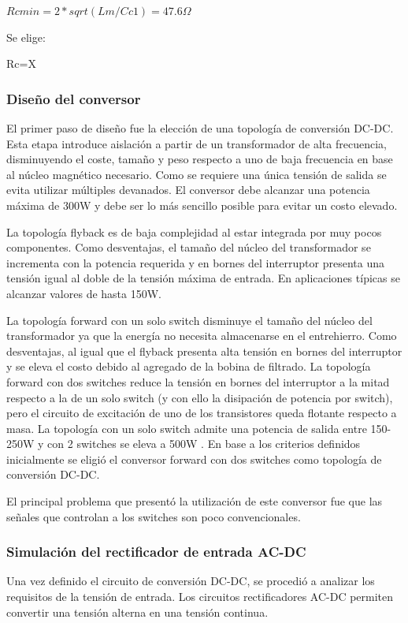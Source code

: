 $Rcmin=2*sqrt(Lm/Cc1)=47.6\Omega$

Se elige:

Rc=X

\subsubsection{Diseño del conversor}

El primer paso de diseño fue la elección de una topología de conversión DC-DC.
Esta etapa introduce aislación a partir de un transformador de alta frecuencia,
disminuyendo el coste, tamaño y peso respecto a uno de baja frecuencia en base al núcleo magnético necesario.
Como se requiere una única tensión de salida se evita utilizar múltiples devanados.
El conversor debe alcanzar una potencia máxima de 300W y debe ser lo más sencillo posible para evitar un costo elevado. 

La topología flyback es de baja complejidad al estar integrada por muy pocos componentes. 
Como desventajas, el tamaño del núcleo del transformador se incrementa con la potencia requerida y en bornes del
interruptor presenta una tensión igual al doble de la tensión máxima de entrada.
En aplicaciones típicas se alcanzar valores de hasta 150W.

La topología forward con un solo switch disminuye el tamaño del núcleo del transformador ya que la energía no necesita almacenarse en el entrehierro.
Como desventajas, al igual que el flyback presenta alta tensión en bornes del interruptor y se eleva el costo debido al agregado de la bobina de filtrado.
La topología forward con dos switches reduce la tensión en bornes del interruptor a la mitad respecto a la de un solo switch (y con ello la disipación de potencia por switch), 
pero el circuito de excitación de uno de los transistores queda flotante respecto a masa. 
La topología con un solo switch admite una potencia de salida entre 150-250W y con 2 switches se eleva a 500W \cite{mohan}\cite{hart}. 
En base a los criterios definidos inicialmente se eligió el conversor forward con dos switches como topología de conversión DC-DC. 

El principal problema que presentó la utilización de este conversor fue que las señales que controlan a los switches son poco convencionales.

\subsubsection{Simulación del rectificador de entrada AC-DC}
Una vez definido el circuito de conversión DC-DC, se procedió a analizar los requisitos de la tensión de entrada. 
Los circuitos rectificadores AC-DC permiten convertir una tensión alterna en una tensión continua.

